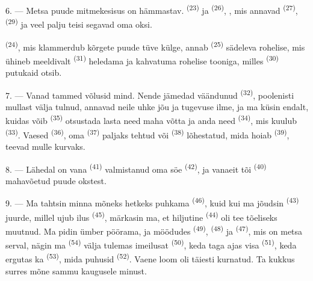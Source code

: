 6. --- Metsa puude mitmekesisus on hämmastav.  \textsuperscript{(23)} ja
 \textsuperscript{(26)}, , mis annavad 
\textsuperscript{(27)},  \textsuperscript{(29)} ja veel palju teisi segavad
oma oksi.

 \textsuperscript{(24)}, mis klammerdub kõrgete puude tüve külge, annab
 \textsuperscript{(25)} sädeleva rohelise, mis ühineb meeldivalt
 \textsuperscript{(31)} heledama ja kahvatuma rohelise tooniga, milles
 \textsuperscript{(30)} putukaid otsib.

\VUsaut{3.0mm}
\VUsaut{3.0mm}

7. --- Vanad tammed võlusid mind. Nende jämedad väändunud 
\textsuperscript{(32)}, poolenisti mullast välja tulnud, annavad neile uhke jõu ja
tugevuse ilme, ja ma küsin endalt, kuidas võib  \textsuperscript{(35)}
otsustada lasta need maha võtta ja anda need  \textsuperscript{(34)}, mis
kuulub  \textsuperscript{(33)}. Vaesed 
\textsuperscript{(36)}, oma  \textsuperscript{(37)} paljaks tehtud või
 \textsuperscript{(38)} lõhestatud, mida hoiab 
\textsuperscript{(39)}, teevad mulle kurvaks.

8. --- Lähedal on vana  \textsuperscript{(41)} valmistanud oma
 söe \textsuperscript{(42)}, ja vanaeit tõi
 \textsuperscript{(40)}  mahavõetud puude okstest.

\VUsaut{3.0mm}
\VUsaut{3.0mm}

9. --- Ma tahtsin minna mõneks hetkeks puhkama 
\textsuperscript{(46)}, kuid kui ma jõudsin  \textsuperscript{(43)}
juurde, millel ujub ilus  \textsuperscript{(45)}, märkasin ma, et hiljutine
 \textsuperscript{(44)} oli tee tõeliseks  muutnud. Ma
pidin ümber pöörama, ja möödudes  \textsuperscript{(49)},
 \textsuperscript{(48)} ja  \textsuperscript{(47)}, mis
on metsa serval, nägin ma  \textsuperscript{(54)} välja tulemas imeilusat
 \textsuperscript{(50)}, keda taga ajas visa 
\textsuperscript{(51)}, keda ergutas ka  \textsuperscript{(53)}, mida puhusid
 \textsuperscript{(52)}. Vaene loom oli täiesti kurnatud. Ta kukkus
surres mõne sammu kaugusele minust.

